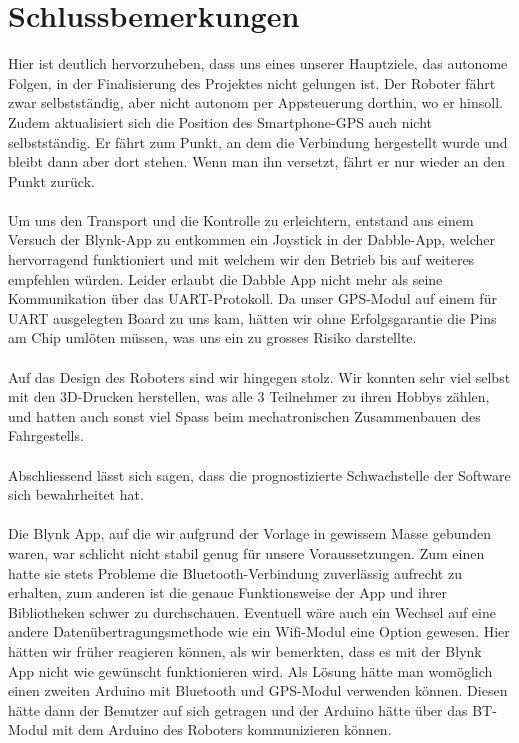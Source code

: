 \section{Schlussbemerkungen}

Hier ist deutlich hervorzuheben, dass uns eines unserer Hauptziele, das autonome Folgen, in der Finalisierung des Projektes nicht gelungen ist. Der Roboter fährt zwar selbstständig, aber nicht autonom per Appsteuerung dorthin, wo er hinsoll. Zudem aktualisiert sich die Position des Smartphone-GPS auch nicht selbstständig. Er fährt zum Punkt, an dem die Verbindung hergestellt wurde und bleibt dann aber dort stehen. Wenn man ihn versetzt, fährt er nur wieder an den Punkt zurück.\\
\\
Um uns den Transport und die Kontrolle zu erleichtern, entstand aus einem Versuch der Blynk-App zu entkommen ein Joystick in der Dabble-App, welcher hervorragend funktioniert und mit welchem wir den Betrieb bis auf weiteres empfehlen würden. Leider erlaubt die Dabble App nicht mehr als seine Kommunikation über das UART-Protokoll. Da unser GPS-Modul auf einem für UART ausgelegten Board zu uns kam, hätten wir ohne Erfolgsgarantie die Pins am Chip umlöten müssen, was uns ein zu grosses Risiko darstellte.\\
\\
Auf das Design des Roboters sind wir hingegen stolz. Wir konnten sehr viel selbst mit den 3D-Drucken herstellen, was alle 3 Teilnehmer zu ihren Hobbys zählen, und hatten auch sonst viel Spass beim mechatronischen Zusammenbauen des Fahrgestells.\\ \\
Abschliessend lässt sich sagen, dass die prognostizierte Schwachstelle der Software sich bewahrheitet hat.\\
\\
Die Blynk App, auf die wir aufgrund der Vorlage in gewissem Masse gebunden waren, war schlicht nicht stabil genug für unsere Voraussetzungen. Zum einen hatte sie stets Probleme die Bluetooth-Verbindung zuverlässig aufrecht zu erhalten, zum anderen ist die genaue Funktionsweise der App und ihrer Bibliotheken schwer zu durchschauen. Eventuell wäre auch ein Wechsel auf eine andere Datenübertragungsmethode wie ein Wifi-Modul eine Option gewesen. Hier hätten wir früher reagieren können, als wir bemerkten, dass es mit der Blynk App nicht wie gewünscht funktionieren wird. Als Lösung hätte man womöglich einen zweiten Arduino mit Bluetooth und GPS-Modul verwenden können. Diesen hätte dann der Benutzer auf sich getragen und der Arduino hätte über das BT-Modul mit dem Arduino des Roboters kommunizieren können.\\
